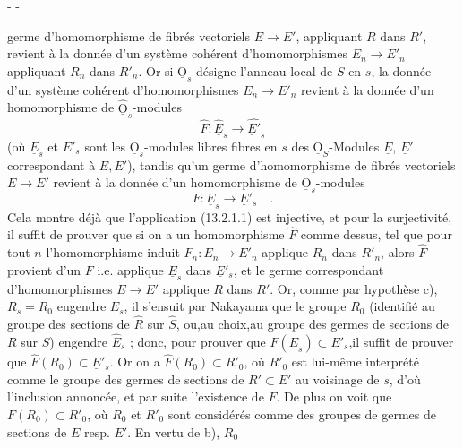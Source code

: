 \begin{center}-  -\end{center}
germe d'homomorphisme de fibrés vectoriels $E\longrightarrow E'$, appliquant $R$ dans $R'$, revient à la donnée d'un système cohérent d'homomorphismes $E_n\longrightarrow E'_n$ appliquant $R_n$ dans $R'_n$. Or si $\underline{\mathrm O}_s$ désigne l'anneau local de $S$ en $s$, la donnée d'un système cohérent d'homomorphismes $E_n\longrightarrow E'_n$ revient à la donnée d'un homomorphisme de $\widehat{\underline{\mathrm O}}_s$-modules
\[
\widehat F:\widehat{\underline E}_s\longrightarrow\widehat{\underline E'}_s
\]
(où $\underline E_s$ et $E'_s$ sont les $\underline{\mathrm O}_s$-modules libres fibres en $s$ des $\underline{\mathrm O}_S$-Modules $\underline E$, $\underline E'$ correspondant à $E,E'$), tandis qu'un germe d'homomorphisme de fibrés vectoriels $E\longrightarrow E'$ revient à la donnée d'un homomorphisme de $\underline{\mathrm O}_s$-modules
\[
F:\underline E_s\longrightarrow\underline E'_s\quad.
\]
Cela montre déjà que l'application (13.2.1.1) est injective, et pour la surjectivité, il suffit de prouver que si on a un homomorphisme $\widehat F$ comme dessus, tel que pour tout $n$ l'homomorphisme induit $F_n:E_n\longrightarrow E'_n$ applique $R_n$ dans $R'_n$, alors $\widehat F$ provient d'un $F$ i.e. applique $\underline E_s$ dans $\underline E'_s$, et le germe correspondant d'homomorphismes $E\longrightarrow E'$ applique $R$ dans $R'$. Or, comme par hypothèse c), $R_s=R_0$ engendre $E_s$, il s'ensuit par Nakayama que le groupe $R_0$ (identifié au groupe des sections de $\widehat R$ sur $\widehat S$, ou,au choix,au groupe des germes de sections de $R$ sur $S$) engendre $\widehat E_s$ ; donc, pour prouver que $\widehat F(\underline E_s)\subset\underline E'_s$,il suffit de prouver que $\widehat F(R_0)\subset\underline E'_s$. Or on a $\widehat F(R_0)\subset R'_0$, où $R'_0$ est lui-même interprété comme le groupe des germes de sections de $R'\subset E'$ au voisinage de $s$, d'où l'inclusion annoncée, et par suite l'existence de $F$. De plus on voit que $F(R_0)\subset R'_0$, où $R_0$ et $R'_0$ sont considérés comme des groupes de germes de sections de $E$ resp. $E'$. En vertu de b), $R_0$


